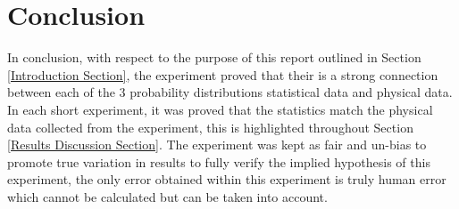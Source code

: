 \documentclass[11pt]{article}
\begin{document}

\section{Conclusion}
\label{Conclusion Section}

In conclusion, with respect to the purpose of this report outlined in Section \ref{Introduction Section}, the experiment proved that their is a strong connection between each of the 3 probability distributions statistical data and physical data. In each short experiment, it was proved that the statistics match the physical data collected from the experiment, this is highlighted throughout Section \ref{Results Discussion Section}. The experiment was kept as fair and un-bias to promote true variation in results to fully verify the implied hypothesis of this experiment, the only error obtained within this experiment is truly human error which cannot be calculated but can be taken into account.





\end{document}

